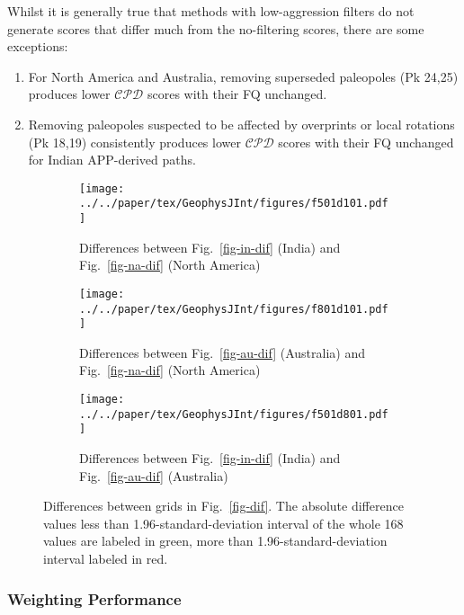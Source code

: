 Whilst it is generally true that methods with low-aggression filters do not
generate scores that differ much from the no-filtering scores, there are some
exceptions:
%
\begin{enumerate}
  \item For North America and Australia, removing superseded paleopoles (Pk
    24,25) produces lower $\mathcal{CPD}$ scores with their FQ unchanged.
  \item Removing paleopoles suspected to be affected by overprints or local
    rotations (Pk 18,19) consistently produces lower $\mathcal{CPD}$ scores with
    their FQ unchanged for Indian APP-derived paths.
\end{enumerate}

\begin{figure*}
  \centering
  \begin{subfigure}{1.01\textwidth}
    \texttt{[image: ../../paper/tex/GeophysJInt/figures/f501d101.pdf]}
    \caption{Differences between Fig.~\ref{fig-in-dif} (India) and
      Fig.~\ref{fig-na-dif} (North America)}\label{fig-i-n-dif}
  \end{subfigure}
  \vspace{.1em}
  \begin{subfigure}{1.01\textwidth}
    \texttt{[image: ../../paper/tex/GeophysJInt/figures/f801d101.pdf]}
    \caption{Differences between Fig.~\ref{fig-au-dif} (Australia) and
      Fig.~\ref{fig-na-dif} (North America)}\label{fig-a-n-dif}
  \end{subfigure}
  \vspace{.1em}
  \begin{subfigure}{1.01\textwidth}
    \texttt{[image: ../../paper/tex/GeophysJInt/figures/f501d801.pdf]}
    \caption{Differences between Fig.~\ref{fig-in-dif} (India) and
      Fig.~\ref{fig-au-dif} (Australia)}\label{fig-i-a-dif}
  \end{subfigure}
  \caption[Differences of $\mathcal{CPD}$ of each plate's paleomagnetic APWPs vs
    its FHM predicted APWP]{Differences between grids in Fig.~\ref{fig-dif}. The
    absolute difference values less than 1.96-standard-deviation interval of the
    whole 168 values are labeled in green, more than 1.96-standard-deviation
    interval labeled in red.}\label{fig-d-dif}
\end{figure*}

\subsubsection{Weighting Performance}

